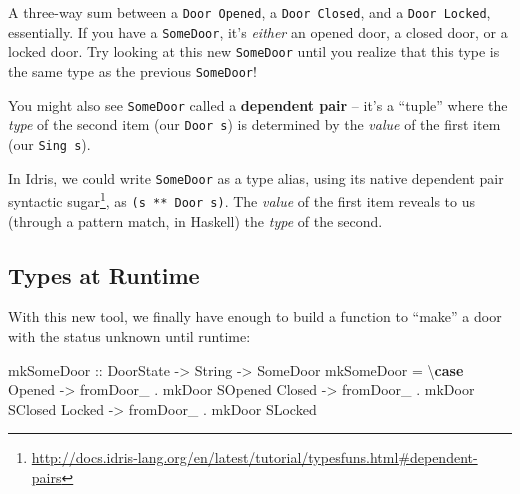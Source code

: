 \documentclass[]{article}
\newenvironment{Shaded}{}{}
\newcommand{\DataTypeTok}[1]{\textcolor[rgb]{0.56,0.13,0.00}{#1}}
\newcommand{\KeywordTok}[1]{\textcolor[rgb]{0.00,0.44,0.13}{\textbf{#1}}}
\newcommand{\NormalTok}[1]{#1}
\newcommand{\OperatorTok}[1]{\textcolor[rgb]{0.40,0.40,0.40}{#1}}
\newcommand{\OtherTok}[1]{\textcolor[rgb]{0.00,0.44,0.13}{#1}}
\renewcommand{\href}[2]{#2\footnote{\url{#1}}}
\begin{document}
A three-way sum between a \texttt{Door\ \textquotesingle{}Opened}, a
\texttt{Door\ \textquotesingle{}Closed}, and a
\texttt{Door\ \textquotesingle{}Locked}, essentially. If you have a
\texttt{SomeDoor}, it's \emph{either} an opened door, a closed door, or a locked
door. Try looking at this new \texttt{SomeDoor} until you realize that this type
is the same type as the previous \texttt{SomeDoor}!

You might also see \texttt{SomeDoor} called a \textbf{dependent pair} -- it's a
``tuple'' where the \emph{type} of the second item (our \texttt{Door\ s}) is
determined by the \emph{value} of the first item (our \texttt{Sing\ s}).

In Idris, we could write \texttt{SomeDoor} as a type alias, using its native
\href{http://docs.idris-lang.org/en/latest/tutorial/typesfuns.html\#dependent-pairs}{dependent
pair syntactic sugar}, as \texttt{(s\ **\ Door\ s)}. The \emph{value} of the
first item reveals to us (through a pattern match, in Haskell) the \emph{type}
of the second.

\subsection{Types at Runtime}\label{types-at-runtime}

With this new tool, we finally have enough to build a function to ``make'' a
door with the status unknown until runtime:

\begin{Shaded}
\begin{Highlighting}[]
\OtherTok{mkSomeDoor ::} \DataTypeTok{DoorState} \OtherTok{{-}\textgreater{}} \DataTypeTok{String} \OtherTok{{-}\textgreater{}} \DataTypeTok{SomeDoor}
\NormalTok{mkSomeDoor }\OtherTok{=}\NormalTok{ \textbackslash{}}\KeywordTok{case}
    \DataTypeTok{Opened} \OtherTok{{-}\textgreater{}}\NormalTok{ fromDoor\_ }\OperatorTok{.}\NormalTok{ mkDoor }\DataTypeTok{SOpened}
    \DataTypeTok{Closed} \OtherTok{{-}\textgreater{}}\NormalTok{ fromDoor\_ }\OperatorTok{.}\NormalTok{ mkDoor }\DataTypeTok{SClosed}
    \DataTypeTok{Locked} \OtherTok{{-}\textgreater{}}\NormalTok{ fromDoor\_ }\OperatorTok{.}\NormalTok{ mkDoor }\DataTypeTok{SLocked}
\end{Highlighting}
\end{Shaded}
\end{document}
